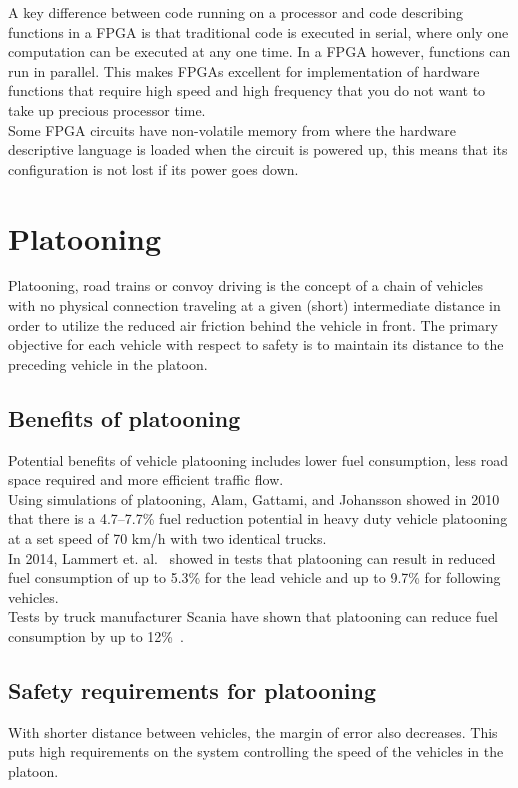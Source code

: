 A key difference between code running on a processor and code describing functions in a FPGA is that traditional code is executed in serial, where only one computation can be executed at any one time. In a FPGA however, functions can run in parallel. This makes FPGAs excellent for implementation of hardware functions that require high speed and high frequency that you do not want to take up precious processor time.\\

Some FPGA circuits have non-volatile memory from where the hardware descriptive language is loaded when the circuit is powered up, this means that its configuration is not lost if its power goes down.

\section{Platooning}
Platooning, road trains or convoy driving is the concept of a chain of vehicles with no physical connection traveling at a given (short) intermediate distance in order to utilize the reduced air friction behind the vehicle in front. The primary objective for each vehicle with respect to safety is to maintain its distance to the preceding vehicle in the platoon.

\subsection{Benefits of platooning}
Potential benefits of vehicle platooning includes lower fuel consumption, less road space required and more efficient traffic flow.\\ 

Using simulations of platooning, Alam, Gattami, and Johansson \cite{johansson2010} showed in 2010 that there is a \mbox{4.7--7.7\%} fuel reduction potential in heavy duty vehicle platooning at a set speed of 70 km/h with two identical trucks.\\

In 2014, Lammert et. al.~\cite{lammert2014} showed in tests that platooning can result in reduced fuel consumption of up to 5.3\% for the lead vehicle and up to 9.7\% for following vehicles.\\

Tests by truck manufacturer Scania have shown that platooning can reduce fuel consumption by up to 12\%~\cite{scania2015}.

\subsection{Safety requirements for platooning}
With shorter distance between vehicles, the margin of error also decreases. This puts high requirements on the system controlling the speed of the vehicles in the platoon.\\

